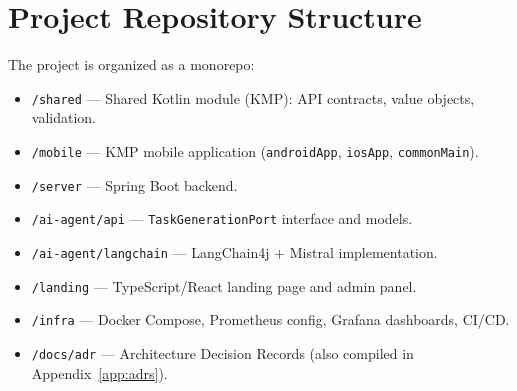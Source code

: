 \section{Project Repository Structure}
\label{sec:project_structure}

The project is organized as a monorepo:

\begin{itemize}
    \item \texttt{/shared} — Shared Kotlin module (KMP): API contracts, value objects, validation.
    \item \texttt{/mobile} — KMP mobile application (\texttt{androidApp}, \texttt{iosApp}, \texttt{commonMain}).
    \item \texttt{/server} — Spring Boot backend.
    \item \texttt{/ai-agent/api} — \texttt{TaskGenerationPort} interface and models.
    \item \texttt{/ai-agent/langchain} — LangChain4j + Mistral implementation.
    \item \texttt{/landing} — TypeScript/React landing page and admin panel.
    \item \texttt{/infra} — Docker Compose, Prometheus config, Grafana dashboards, CI/CD.
    \item \texttt{/docs/adr} — Architecture Decision Records (also compiled in Appendix~\ref{app:adrs}).
\end{itemize}
